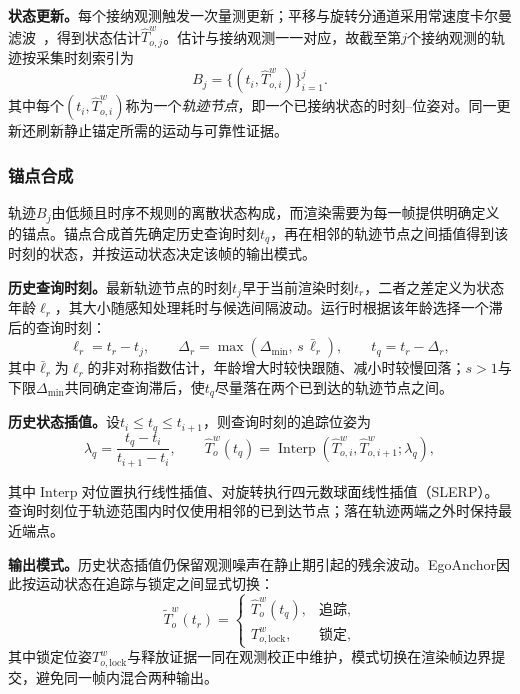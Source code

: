 \documentclass[review]{vgtc}
\begin{document}
\textbf{状态更新。}每个接纳观测触发一次量测更新；平移与旋转分通道采用常速度卡尔曼滤波~\cite{kalman1960new}，得到状态估计$\widehat{T}_{o,j}^{w}$。估计与接纳观测一一对应，故截至第$j$个接纳观测的轨迹按采集时刻索引为
\begin{equation}
B_j = \{(t_i, \widehat{T}_{o,i}^{w})\}_{i=1}^{j}.
\label{eq:trajectory}
\end{equation}
其中每个$(t_i, \widehat{T}_{o,i}^{w})$称为一个\emph{轨迹节点}，即一个已接纳状态的时刻--位姿对。同一更新还刷新静止锚定所需的运动与可靠性证据。

\subsubsection{锚点合成}\label{sec:frame-output}

轨迹$B_j$由低频且时序不规则的离散状态构成，而渲染需要为每一帧提供明确定义的锚点。锚点合成首先确定历史查询时刻$t_q$，再在相邻的轨迹节点之间插值得到该时刻的状态，并按运动状态决定该帧的输出模式。

\textbf{历史查询时刻。}最新轨迹节点的时刻$t_j$早于当前渲染时刻$t_r$，二者之差定义为状态年龄$\ell_r$，其大小随感知处理耗时与候选间隔波动。运行时根据该年龄选择一个滞后的查询时刻：
\begin{equation}
\ell_r = t_r - t_j, \qquad \Delta_r = \max(\Delta_{\min},\, s\,\bar{\ell}_r), \qquad t_q = t_r - \Delta_r,
\label{eq:target-time}
\end{equation}
其中$\bar{\ell}_r$为$\ell_r$的非对称指数估计，年龄增大时较快跟随、减小时较慢回落；$s>1$与下限$\Delta_{\min}$共同确定查询滞后，使$t_q$尽量落在两个已到达的轨迹节点之间。

\textbf{历史状态插值。}设$t_i \leq t_q \leq t_{i+1}$，则查询时刻的追踪位姿为
\begin{equation}
\lambda_q = \frac{t_q - t_i}{t_{i+1} - t_i}, \qquad \widehat{T}_o^w(t_q) = \operatorname{Interp}(\widehat{T}_{o,i}^{w}, \widehat{T}_{o,i+1}^{w}; \lambda_q),
\label{eq:history-interp}
\end{equation}

其中$\operatorname{Interp}$对位置执行线性插值、对旋转执行四元数球面线性插值（SLERP）。查询时刻位于轨迹范围内时仅使用相邻的已到达节点；落在轨迹两端之外时保持最近端点。

\textbf{输出模式。}历史状态插值仍保留观测噪声在静止期引起的残余波动。EgoAnchor因此按运动状态在追踪与锁定之间显式切换：
\begin{equation}
\widetilde{T}_o^w(t_r) = \begin{cases}
\widehat{T}_o^w(t_q), & \text{追踪}, \\
T_{o,\mathrm{lock}}^w, & \text{锁定},
\end{cases}
\label{eq:staticlock}
\end{equation}
其中锁定位姿$T_{o,\mathrm{lock}}^w$与释放证据一同在观测校正中维护，模式切换在渲染帧边界提交，避免同一帧内混合两种输出。
\end{document}

